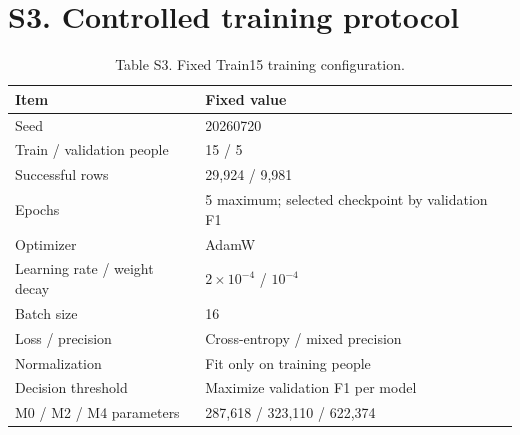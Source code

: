 \documentclass[10pt]{article}
\begin{document}
\section*{S3. Controlled training protocol}
\begin{table}[h]\centering\small
\caption{Table S3. Fixed Train15 training configuration.}\label{tab:s3training}
\begin{tabular}{ll}\toprule Item & Fixed value\\\midrule
Seed & 20260720\\
Train / validation people & 15 / 5\\
Successful rows & 29,924 / 9,981\\
Epochs & 5 maximum; selected checkpoint by validation F1\\
Optimizer & AdamW\\
Learning rate / weight decay & $2\times10^{-4}$ / $10^{-4}$\\
Batch size & 16\\
Loss / precision & Cross-entropy / mixed precision\\
Normalization & Fit only on training people\\
Decision threshold & Maximize validation F1 per model\\
M0 / M2 / M4 parameters & 287,618 / 323,110 / 622,374\\\bottomrule
\end{tabular}
\end{table}
\end{document}
